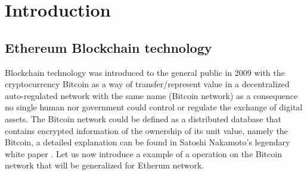 

\section{Introduction}

\subsection{Ethereum Blockchain technology}
Blockchain technology was introduced to the general public in 2009 with the cryptocurrency Bitcoin \cite{swan2015blockchain} as a way of transfer/represent value in a decentralized auto-regulated network with the same name (Bitcoin network) as a consequence no single human nor government could control or regulate the exchange of digital assets. The Bitcoin network could be defined as a distributed database that contains encrypted information of the ownership of its unit value, namely the Bitcoin, a detailed explanation can be found in Satoshi Nakamoto's legendary white paper \cite{nakamoto2008bitcoin}. Let us now introduce a example of a operation on the Bitcoin network that will be generalized for Etherum network.

